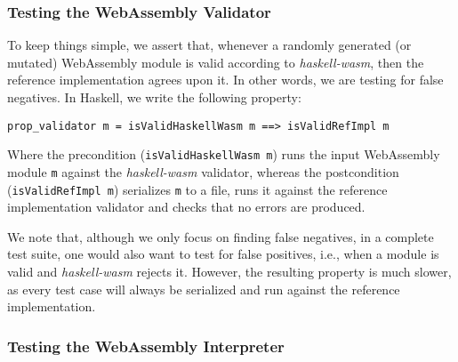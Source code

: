 \documentclass[sigconf, anonymous, review]{acmart}
\begin{document}

\subsubsection{Testing the WebAssembly Validator}

To keep things simple, we assert that, whenever a randomly generated (or
mutated) WebAssembly module is valid according to \textit{haskell-wasm}, then
the reference implementation agrees upon it.
%
In other words, we are testing for false negatives.
%
In Haskell, we write the following property:

\begin{verbatim}
prop_validator m = isValidHaskellWasm m ==> isValidRefImpl m
\end{verbatim}

Where the precondition (\texttt{isValidHaskellWasm m}) runs the input WebAssembly
module \texttt{m} against the \textit{haskell-wasm} validator, whereas the
postcondition (\texttt{isValidRefImpl m}) serializes \texttt{m} to a file, runs it
against the reference implementation validator and checks that no errors are
produced.

We note that, although we only focus on finding false negatives, in a complete
test suite, one would also want to test for false positives, i.e., when a module
is valid and \textit{haskell-wasm} rejects it.
%
%
However, the resulting property is much slower, as every test case will always
be serialized and run against the reference implementation.




\subsubsection{Testing the WebAssembly Interpreter}
\end{document}
